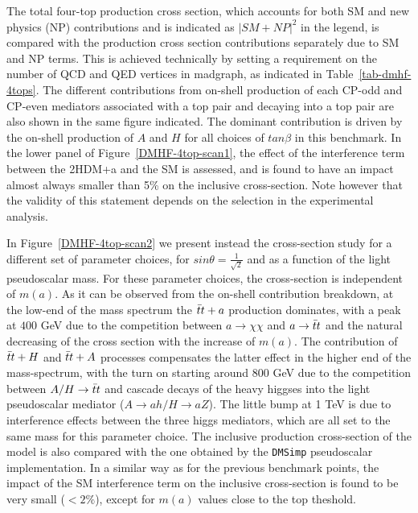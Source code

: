 The total four-top production cross section, which accounts for both SM and new physics (NP) contributions and is indicated as $|SM+NP|^2$ in the legend, is compared with the production cross section contributions separately due to SM and NP terms. 
This is achieved technically by setting a requirement on the number of QCD and QED vertices in madgraph, as indicated in Table~\ref{tab-dmhf-4tops}.
The different contributions from on-shell production of each CP-odd and CP-even mediators associated with a top pair and
decaying into a top pair are also shown in the same figure indicated. 
The dominant contribution is driven by the on-shell production of $A$ and $H$ for all choices of $tan\beta$ in this benchmark. 
In the lower panel of Figure~\ref{DMHF-4top-scan1}, the effect of the interference term between the 2HDM+a and the SM is assessed, and is found to have an impact almost always smaller than 5\% on the inclusive cross-section. Note however that the validity of this statement depends on the selection in the experimental analysis. 


In Figure~\ref{DMHF-4top-scan2} we present instead the cross-section study for a different set of parameter choices, for $sin\theta
= \frac{1}{\sqrt{2}}$ and as a function of the light pseudoscalar mass. 
For these parameter choices, the cross-section is independent of $m(a)$. 
As it can be observed from the on-shell contribution breakdown, at the low-end of the mass spectrum the $\bar{t}t+a$ production dominates, with a peak at $400$ GeV due to the competition between $a\rightarrow \chi\chi$ and $a\rightarrow \bar{t}t$ and the natural decreasing of the cross section with the increase of $m(a)$.  
The contribution of $\bar{t}t+H$ and $\bar{t}t+A$ processes compensates the latter effect in the higher end of the mass-spectrum, with the turn on starting around $800$ GeV due to the competition between $A/H\rightarrow\bar{t}t$ and cascade decays of the heavy higgses into the light pseudoscalar mediator ($A\rightarrow ah/H\rightarrow aZ$). 
The little bump at 1 TeV is due to interference effects between the three higgs mediators, which are all set to the same mass for this parameter choice.  
The inclusive production cross-section of the \hdma model is also compared with the one obtained by the \texttt{DMSimp} pseudoscalar implementation. 
In a similar way as for the previous benchmark points, the impact of the SM interference term on the inclusive cross-section is found to be very small ($<2\%$), except for $m(a)$ values close to the top theshold. 

